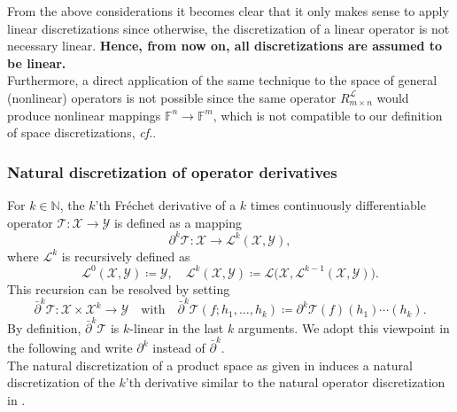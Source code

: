 \documentclass[a4paper]{paper}
\newcommand*{\SPC}[1]{{\ensuremath{\mathscr{#1}}}}
\newcommand*{\SPCL}{\SPC{L}}
\newcommand*{\SPCX}{\SPC{X}}
\newcommand*{\SPCY}{\SPC{Y}}
\newcommand{\FIELD}{{\ensuremath{\mathbb{F}}}}
\newcommand*{\Fn}{{\ensuremath{\FIELD^n}}}
\newcommand*{\Fm}{{\ensuremath{\FIELD^m}}}
\newcommand{\NN}{{\ensuremath{\mathbb{N}}}}
\newcommand*{\OP}[1]{{\ensuremath{\mathcal{#1}}}}
\newcommand*{\OPT}{\OP{T}}
\newcommand*{\REST}[2]{\ensuremath{R_{#1}^{#2}}}
\DeclareMathOperator{\DEFEQ}{{\coloneqq}}
\newcommand{\cf}{\textsl{cf.}\xspace}
\begin{document}
\begin{remark}
 From the above considerations it becomes clear that it only makes sense to apply linear discretizations since 
 otherwise, the discretization of a linear operator is not necessary linear. \textbf{Hence, from now on, all 
 discretizations are assumed to be linear.}\\
 Furthermore, a direct application of the same technique to the space of general (nonlinear) operators is not possible 
 since the same operator $\REST{m\times n}{\SPCL}$ would produce nonlinear mappings $\Fn \to \Fm$, which is 
 not compatible to our definition of space discretizations, \cf {}.
\end{remark}


\subsubsection{Natural discretization of operator derivatives}
\label{subsubsec:discr:operator:op_deriv}

For $k \in \NN$, the $k$'th Fr\'{e}chet derivative of a $k$ times continuously differentiable operator 
$\OPT \colon \SPCX \to \SPCY$ is defined as a mapping
%
\begin{equation*}
 \partial^k \OPT \colon \SPCX \to \SPCL^k(\SPCX, \SPCY),
\end{equation*}
%
where $\SPCL^k$ is recursively defined as 
%
\begin{equation*}
 \SPCL^0(\SPCX, \SPCY) \DEFEQ  \SPCY, \quad 
 \SPCL^k(\SPCX, \SPCY) \DEFEQ  \SPCL\big( \SPCX, \SPCL^{k-1}(\SPCX, \SPCY) \big).
\end{equation*}
%
This recursion can be resolved by setting
%
\begin{equation*}
 \bar\partial^k \OPT \colon \SPCX \times \SPCX^k \to \SPCY
 \quad \text{with} \quad
 \bar\partial^k \OPT(f; h_1, \dots, h_k) \DEFEQ  \partial^k\OPT(f)(h_1)\cdots(h_k).
\end{equation*}
%
By definition, $\bar\partial^k\OPT$ is $k$-linear in the last $k$ arguments. We adopt this viewpoint in the following 
and write $\partial^k$ instead of $\bar\partial^k$.\\
%
The natural discretization of a product space as given in  induces a 
natural discretization of the $k$'th derivative similar to the natural operator discretization in 
.
\end{document}
